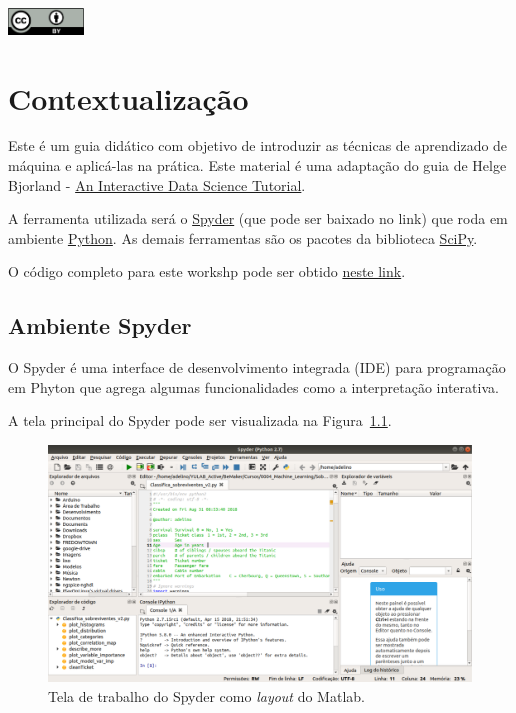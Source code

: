 \documentclass[a4paper,12pt]{report}
\begin{document}
\vspace{1cm}
\begin{center}
\includegraphics[keepaspectratio, width=2cm]{CC-BY_icon.pdf}
\end{center}

\pagebreak
\thispagestyle{empty}

\chapter{Contextualização}

Este é um guia didático com objetivo de introduzir as técnicas de aprendizado de máquina e aplicá-las na prática. Este material é uma adaptação do guia de Helge Bjorland - \href{https://www.kaggle.com/helgejo/an-interactive-data-science-tutorial}{An Interactive Data Science Tutorial}.

A ferramenta utilizada será o \href{https://pypi.org/project/spyder/}{Spyder} (que pode ser baixado no link) que roda em ambiente \href{https://www.python.org/}{Python}. As demais ferramentas são os pacotes da biblioteca \href{https://www.scipy.org/}{SciPy}. 

O código completo para este workshp pode ser obtido \href{www.cefala.org/~adelino/adelinocpp/YuLab/Workshop/WS_MachineLearning_v2.py}{neste link}.

\section{Ambiente Spyder}

O Spyder é uma interface de desenvolvimento integrada (IDE) para programação em Phyton que agrega algumas funcionalidades como a interpretação interativa.

A tela principal do Spyder pode ser visualizada na Figura~\ref{Fig:Spyder_Tela_01}.

\begin{figure}[h]
	\includegraphics[keepaspectratio, width=\textwidth]{Spyder_tela_01.pdf}
	\caption{Tela de trabalho do Spyder como \textit{layout} do Matlab.}
	\label{Fig:Spyder_Tela_01}
\end{figure}
\end{document}
